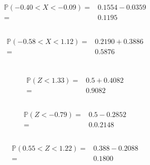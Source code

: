 \documentclass{article}
\begin{document}
        \subsection{}
            \begin{equation*}
                \begin{split}
                    \mathbb{P}(-0.40<X<-0.09)=&0.1554-0.0359\\
                        =&0.1195
                \end{split}
            \end{equation*}
        \subsection{}
            \begin{equation*}
                \begin{split}
                    \mathbb{P}(-0.58<X<1.12)=&0.2190+0.3886\\
                        =&0.5876
                \end{split}
            \end{equation*}
    \section{}
        \subsection{}  
            \begin{equation*}
                \begin{split}
                    \mathbb{P}(Z<1.33)=&0.5+0.4082\\
                        =&0.9082
                \end{split}
            \end{equation*}
        \subsection{}  
            \begin{equation*}
                \begin{split}
                    \mathbb{P}(Z<-0.79)=&0.5-0.2852\\
                        =&0.0.2148
                \end{split}
            \end{equation*}
        \subsection{}  
            \begin{equation*}
                \begin{split}
                    \mathbb{P}(0.55<Z<1.22)=&0.388-0.2088\\
                        =&0.1800
                \end{split}
            \end{equation*}
\end{document}
